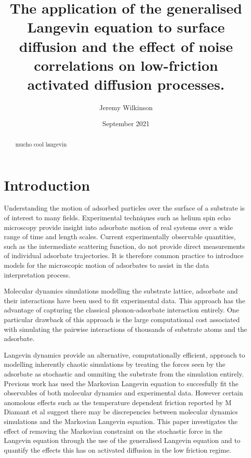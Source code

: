 \documentclass{article}
\title{The application of the generalised Langevin equation to surface diffusion and the effect of noise correlations on low-friction activated diffusion processes.}
\author{Jeremy Wilkinson}
\date{September 2021}
\begin{document}
\maketitle

\begin{abstract}
    mucho cool langevin
\end{abstract}

\tableofcontents

\section{Introduction}

Understanding the motion of adsorbed particles over the surface of a substrate is of interest to many fields. Experimental techniques such as helium spin echo microscopy provide insight into adsorbate motion of real systems over a wide range of time and length scales. Current experimentally observable quantities, such as the intermediate scattering function, do not provide direct measurements of individual adsorbate trajectories. It is therefore common practice to introduce models for the microscopic motion of adsorbates to assist in the data interpretation process. 

Molecular dynamics simulations modelling the substrate lattice, adsorbate and their interactions have been used to fit experimental data. This approach has the advantage of capturing the classical phonon-adsorbate interaction entirely. One particular drawback of this approach is the large computational cost associated with simulating the pairwise interactions of thousands of substrate atoms and the adsorbate. 

Langevin dynamics provide an alternative, computationally efficient, approach to modelling inherently chaotic simulations by treating the forces seen by the adsorbate as stochastic and ommiting the substrate from the simulation entirely. Previous work has used the Markovian Langevin equation to succesfully fit the observables of both molecular dynamics and experimental data. However certain anomolous effects such as the temperature dependent friction reported by M Diamant et al suggest there may be discrepencies between molecular dynamics simulations and the Markovian Langevin equation. This paper investigates the effect of removing the Markovian constraint on the stochastic force in the Langevin equation through the use of the generalised Langevin equation and to quantify the effects this has on activated diffusion in the low friction regime. 
\end{document}
